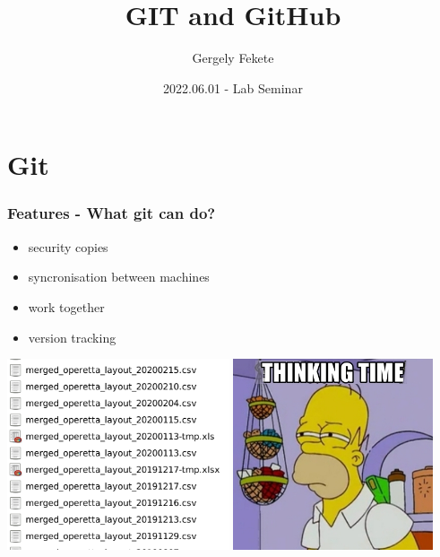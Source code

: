\documentclass[aspectratio=169]{beamer}
\title{GIT and GitHub}
\author{Gergely Fekete}
\date{2022.06.01 -  Lab Seminar}
\begin{document}
\begin{frame}
\titlepage
\end{frame}

\section{Git}



\begin{frame}
	\frametitle<presentation>{Features - What git can do?}
	
	\begin{itemize}
	\item security copies
	\item syncronisation between machines
	\item work together
	\item version tracking
	\end{itemize}

\end{frame}

 
\begin{frame}
\includegraphics[height=160pt]{pictures/Screenshot_2020-02-25_17-47-03-ugly_folder-zoom_in.png}
\includegraphics[height=160pt]{pictures/Simson.png}
\end{frame}


\end{document}
